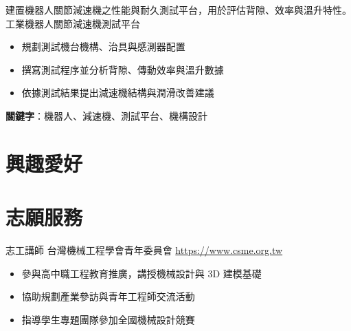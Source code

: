 \documentclass[a4paper, serif, 10pt]{moderncv}
\begin{document}
        {建置機器人關節減速機之性能與耐久測試平台，用於評估背隙、效率與溫升特性。}
        {工業機器人關節減速機測試平台}
        {}
        {}
        {\begin{itemize}
\item 規劃測試機台機構、治具與感測器配置
\item 撰寫測試程序並分析背隙、傳動效率與溫升數據
\item 依據測試結果提出減速機結構與潤滑改善建議
\end{itemize}
\textbf{關鍵字}：機器人、減速機、測試平台、機構設計}
\section{興趣愛好}

\section{志願服務}

        {志工講師}
        {台灣機械工程學會青年委員會}
        {\url{https://www.csme.org.tw}}
        {}
        {\begin{itemize}
\item 參與高中職工程教育推廣，講授機械設計與 3D 建模基礎
\item 協助規劃產業參訪與青年工程師交流活動
\item 指導學生專題團隊參加全國機械設計競賽
\end{itemize}}
    
\end{document}
